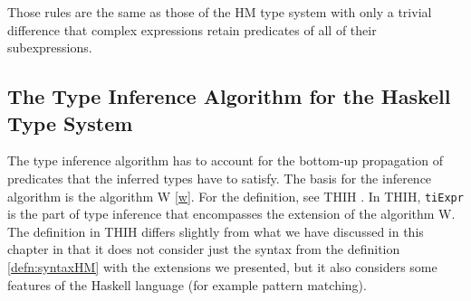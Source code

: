 Those rules are the same as those of the HM type system with only a trivial difference that complex expressions retain predicates of all of their subexpressions.

\subsection{The Type Inference Algorithm for the Haskell Type System}

The type inference algorithm has to account for the bottom-up propagation of predicates that the inferred types have to satisfy. The basis for the inference algorithm is the algorithm W \ref{w}. For the definition, see THIH \cite{jones1999typing}. In THIH, \lstinline[language=haskell]{tiExpr} is the part of type inference that encompasses the extension of the algorithm W. The definition in THIH differs slightly from what we have discussed in this chapter in that it does not consider just the syntax from the definition \ref{defn:syntaxHM} with the extensions we presented, but it also considers some features of the Haskell language (for example pattern matching).
